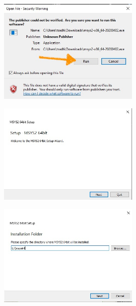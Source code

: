 \documentclass{article}
\begin{document}
 \begin{figure}[H]
 \begin{subfigure}[c]{0.5\textwidth}
\includegraphics[width=0.75\textwidth]{Plots/AutoInstall1.jpeg}
\end{subfigure}
\begin{subfigure}[c]{0.5\textwidth}
\includegraphics[width=0.75\textwidth]{Plots/AutoInstall2.jpeg}
\end{subfigure}
\begin{subfigure}[c]{0.5\textwidth}
\includegraphics[width=0.75\textwidth]{Plots/AutoInstall3.jpeg}

\end{subfigure}
\end{figure}
\end{document}
